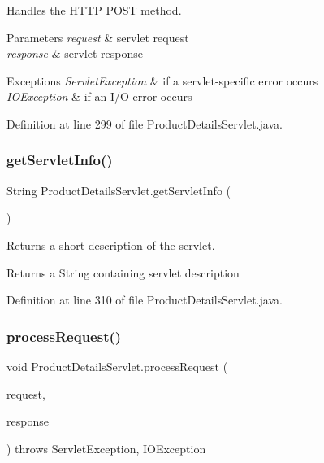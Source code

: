 Handles the H\+T\+TP {\ttfamily P\+O\+ST} method.


\begin{DoxyParams}{Parameters}
{\em request} & servlet request \\
\hline
{\em response} & servlet response \\
\hline
\end{DoxyParams}

\begin{DoxyExceptions}{Exceptions}
{\em Servlet\+Exception} & if a servlet-\/specific error occurs \\
\hline
{\em I\+O\+Exception} & if an I/O error occurs \\
\hline
\end{DoxyExceptions}


Definition at line 299 of file Product\+Details\+Servlet.\+java.

\mbox{\label{class_product_details_servlet_a19cbce0c3822e37fac263d0f5ec4a5c0}} 
\subsubsection{\texorpdfstring{getServletInfo()}{getServletInfo()}}
{\footnotesize\ttfamily String Product\+Details\+Servlet.\+get\+Servlet\+Info (\begin{DoxyParamCaption}{ }\end{DoxyParamCaption})}

Returns a short description of the servlet.

\begin{DoxyReturn}{Returns}
a String containing servlet description 
\end{DoxyReturn}


Definition at line 310 of file Product\+Details\+Servlet.\+java.

\mbox{\label{class_product_details_servlet_a1da6975765e1785e6152905ec5fbcd2d}} 
\subsubsection{\texorpdfstring{processRequest()}{processRequest()}}
{\footnotesize\ttfamily void Product\+Details\+Servlet.\+process\+Request (\begin{DoxyParamCaption}\item[{Http\+Servlet\+Request}]{request,  }\item[{Http\+Servlet\+Response}]{response }\end{DoxyParamCaption}) throws Servlet\+Exception, I\+O\+Exception\hspace{0.3cm}{\ttfamily [protected]}}


